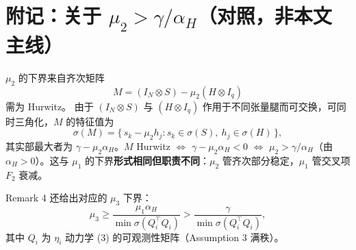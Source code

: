 \documentclass[UTF8]{ctexart}
\begin{document}
\section{附记：关于 $\mu_2 > \gamma / \alpha_H$（对照，非本文主线）}

$\mu_2$ 的下界来自齐次矩阵
\[
M = (I_N \otimes S) - \mu_2 (H \otimes I_q)
\]
需为 Hurwitz。
由于 $(I_N \otimes S)$ 与 $(H \otimes I_q)$ 作用于不同张量腿而可交换，可同时三角化，$M$ 的特征值为
\[
\sigma(M) = \{\, s_k - \mu_2 h_j : s_k \in \sigma(S),\ h_j \in \sigma(H) \,\},
\]
其实部最大者为 $\gamma - \mu_2 \alpha_H$。$M$ Hurwitz $\Leftrightarrow$ $\gamma - \mu_2 \alpha_H < 0$ $\Leftrightarrow$ $\mu_2 > \gamma/\alpha_H$（由 $\alpha_H > 0$）。这与 $\mu_1$ 的下界\textbf{形式相同但职责不同}：$\mu_2$ 管齐次部分稳定，$\mu_1$ 管交叉项 $F_2$ 衰减。

Remark 4 还给出对应的 $\mu_3$ 下界：
\[
\mu_3 \ge \frac{\mu_1 \alpha_H}{\min\sigma(Q_i^\top Q_i)}
> \frac{\gamma}{\min\sigma(Q_i^\top Q_i)},
\]
其中 $Q_i$ 为 $\eta_i$ 动力学 (3) 的可观测性矩阵（Assumption 3 满秩）。
\end{document}
